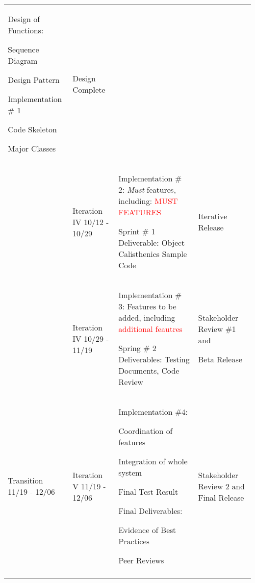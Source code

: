 \documentclass[11pt]{article}
\newenvironment{packed_itemize}{
\begin{itemize}
  \setlength{\itemsep}{1pt}
  \setlength{\parskip}{0pt}
  \setlength{\parsep}{0pt}
}{\end{itemize}}
\begin{document}
\begin{table}
\begin{tabular}{|p{0.9in}|p{0.9in}|p{3.2in}|p{.9in}|}
 Design of Functions:
	\begin{packed_itemize}
		\vspace{-0.15in}
		\item Sequence Diagram
		\item  Design Pattern
	\end{packed_itemize}

 Implementation \# 1
	\begin{packed_itemize}
		\vspace{-0.15in}
		\item Code Skeleton
		\item Major Classes
	\end{packed_itemize}
 & Design Complete \\  \cline{2-4}
&
 Iteration IV 10/12 - 10/29 &
 Implementation \# 2: \emph{Must} features, including: \textcolor{red}{MUST FEATURES}
 
Sprint \# 1 Deliverable: Object Calisthenics Sample Code
 & Iterative Release \\  \cline{2-4}
 &
 Iteration IV 10/29 - 11/19 &
 Implementation \# 3: Features to be added, including \textcolor{red}{additional feautres}

Spring \# 2 Deliverables: Testing Documents, Code Review &
 Stakeholder Review \#1 
and

Beta Release \\ \hline
Transition  11/19 - 12/06 &
Iteration V 11/19 - 12/06 &
Implementation \#4: 
	\begin{packed_itemize}
		\vspace{-0.15in}
		\item Coordination of features
		\item Integration of whole system
	\end{packed_itemize}
Final Test Result 

Final Deliverables:
	\begin{packed_itemize}
	\vspace{-0.15in}
		\item Evidence of Best Practices
		\item Peer Reviews
	\end{packed_itemize}
	\vspace{-0.4in}
& 
Stakeholder Review 2 and Final Release
\\
&&& \\
\hline
\end{tabular}
\end{table}
\end{document}
